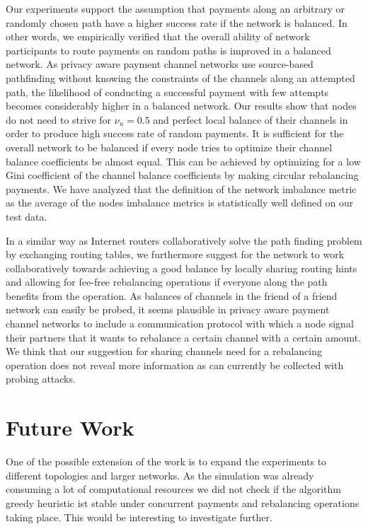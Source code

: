 \documentclass[a4paper]{paper}
\begin{document}
Our experiments support the assumption that payments along an arbitrary or randomly chosen path have a higher success rate if the network is balanced. 
In other words, we empirically verified that the overall ability of network participants to route payments on random paths is improved in a balanced network. 
As privacy aware payment channel networks use source-based pathfinding without knowing the constraints of the channels along an attempted path, the likelihood of conducting a successful payment with few attempts becomes considerably higher in a balanced network.
Our results show that nodes do not need to strive for $\nu_u = 0.5$ and perfect local balance of their channels in order to produce high success rate of random payments.
It is sufficient for the overall network to be balanced if every node tries to optimize their channel balance coefficients be almost equal. 
This can be achieved by optimizing for a low Gini coefficient of the channel balance coefficients by making circular rebalancing payments.
We have analyzed that the definition of the network imbalance metric as the average of the nodes imbalance metrics is statistically well defined on our test data.

In a similar way as Internet routers collaboratively solve the path finding problem by exchanging routing tables, we furthermore suggest for the network to work collaboratively towards achieving a good balance by locally sharing routing hints and allowing for fee-free rebalancing operations if everyone along the path benefits from the operation. 
As balances of channels in the friend of a friend network can easily be probed, it seems plausible in privacy aware payment channel networks to include a communication protocol with which a node signal their partners that it wants to rebalance a certain channel with a certain amount.
We think that our suggestion for sharing channels need for a rebalancing operation does not reveal more information as can currently be collected with probing attacks.



\section{Future Work}
\label{sec:future}

One of the possible extension of the work is to expand the experiments to different topologies and larger networks.
As the simulation was already consuming a lot of computational resources we did not check if the algorithm greedy heuristic ist stable under concurrent payments and rebalancing operations taking place. 
This would be interesting to investigate further.
\end{document}
